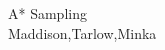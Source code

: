 \begin{frame}
  \begin{center}
    {\huge A* Sampling
    } \\
    Maddison,Tarlow,Minka
  \end{center}
\end{frame}


